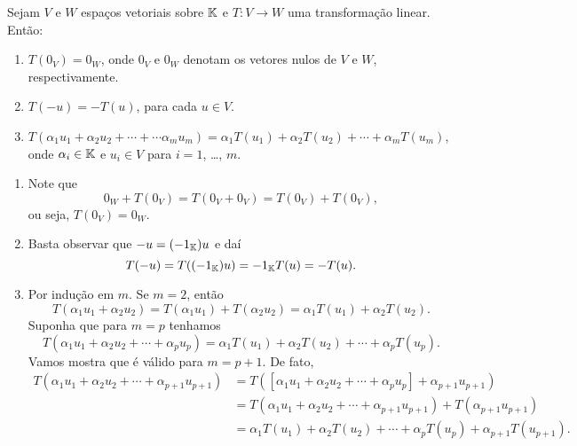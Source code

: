 \begin{lema}
    Sejam $V$ e $W$ espaços vetoriais sobre $\mathbb{K}$ e $T \colon V \to W$ uma transformação linear. Então:
    \begin{enumerate}[label={\roman*})]\label{transformacao_linear_propriedades_basicas}
        \item $T(0_V) = 0_W$, onde $0_V$ e $0_W$ denotam os vetores nulos de $V$ e $W$, respectivamente.

        \item $T(-u) = -T(u)$, para cada $u \in V$.

        \item $T(\alpha_1u_1 + \alpha_2u_2 + \cdots + \cdots \alpha_mu_m) = \alpha_1 T(u_1) + \alpha_2 T(u_2) + \cdots + \alpha_mT(u_m)$, onde $\alpha_i \in \mathbb{K}$ e $u_i \in V$ para $i = 1$, \dots, $m$.
    \end{enumerate}
\end{lema}
\begin{prova}
    \begin{enumerate}[label={\roman*})]
        \item Note que
        \[
            0_W + T(0_V) = T(0_V + 0_V) = T(0_V) + T(0_V),
        \]
        ou seja, $T(0_V) = 0_W$.

        \item Basta observar que $-u = (-1_{\mathbb{K}})u$ e daí
        \[
            T(-u) = T((-1_{\mathbb{K}})u) = -1_{\mathbb{K}}T(u) = -T(u).
        \]

        \item Por indução em $m$. Se $m = 2$, então
        \[
            T(\alpha_1u_1 + \alpha_2u_2) = T(\alpha_1u_1) + T(\alpha_2u_2) = \alpha_1T(u_1) + \alpha_2T(u_2).
        \]
        Suponha que para $m = p$ tenhamos
        \[
            T(\alpha_1u_1 + \alpha_2u_2 + \cdots + \alpha_pu_p) = \alpha_1T(u_1) + \alpha_2T(u_2) + \cdots + \alpha_pT(u_p).
        \]
        Vamos mostra que é válido para $m = p + 1$. De fato,
        \begin{align*}
            T(\alpha_1u_1 + \alpha_2u_2 + \cdots + \alpha_{p + 1}u_{p + 1}) &= T([\alpha_1u_1 + \alpha_2u_2 + \cdots + \alpha_pu_p] + \alpha_{p + 1}u_{p + 1}) \\ &= T(\alpha_1u_1 + \alpha_2u_2 + \cdots + \alpha_{p + 1}u_{p + 1}) + T(\alpha_{p+1}u_{p+1}) \\ &= \alpha_1T(u_1) + \alpha_2T(u_2) + \cdots + \alpha_pT(u_p) + \alpha_{p+1}T(u_{p+1}).
        \end{align*}
    \end{enumerate}
\end{prova}

